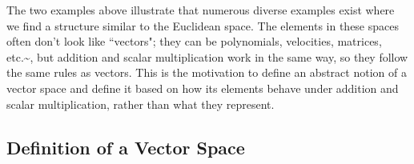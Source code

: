 \documentclass[
  letterpaper,
  DIV=11,
  numbers=noendperiod]{scrartcl}
\theoremstyle{remark}
\begin{document}
The two examples above illustrate that numerous diverse examples exist
where we find a structure similar to the Euclidean space. The elements
in these spaces often don't look like ``vectors"; they can be
polynomials, velocities, matrices, etc.\textasciitilde, but addition and
scalar multiplication work in the same way, so they follow the same
rules as vectors. This is the motivation to define an abstract notion of
a vector space and define it based on how its elements behave under
addition and scalar multiplication, rather than what they represent.

\subsection{Definition of a Vector
Space}\label{definition-of-a-vector-space}
\end{document}
